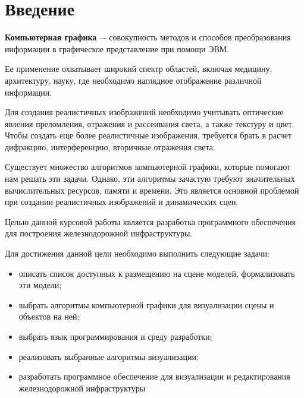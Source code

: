 \chapter*{Введение}

\textbf{Компьютерная графика} –- совокупность методов и способов преобразования информации
в графическое представление при помощи ЭВМ.

Ее применение охватывает широкий спектр областей, включая медицину, 
архитектуру, науку, где необходимо наглядное отображение различной
информации.

Для создания реалистичных изображений необходимо учитывать оптические явления
преломления, отражения и рассеивания света, а также текстуру и цвет. Чтобы создать еще более
реалистичные изображения, требуется брать в расчет дифракцию, интерференцию, вторичные
отражения света.

Существует множество алгоритмов компьютерной графики, которые помогают нам решать
эти задачи. Однако, эти алгоритмы зачастую требуют значительных вычислительных ресурсов,
памяти и времени. Это является основной проблемой при создании реалистичных изображений и
динамических сцен.

Целью данной курсовой работы является разработка программного обеспечения для построения
железнодорожной инфраструктуры. 

Для достижения данной цели необходимо выполнить следующие задачи:
\begin{itemize}
    \item описать список доступных к размещению на сцене моделей, формализовать эти модели;
    \item выбрать алгоритмы компьютерной графики для визуализации сцены и
    объектов на ней;
    \item выбрать язык программирования и среду разработки;
    \item реализовать выбранные алгоритмы визуализации;
    \item разработать программное обеспечение для визуализации и редактирования
    железнодорожной инфраструктуры
\end{itemize}

